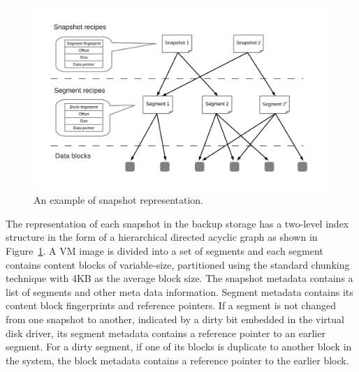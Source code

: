 \begin{figure}[htbp]
  \centering
  \includegraphics[width=5in]{images/snapshot_representation.pdf}
  \caption{An example of snapshot representation.}
  \label{fig:snapshot}
\end{figure}

The representation of each snapshot in the backup
storage has a two-level index structure in the form of a
hierarchical directed acyclic graph as shown in Figure~\ref{fig:snapshot}.
A VM image is divided into a set of segments and each
segment contains content blocks of variable-size, partitioned using the standard chunking technique with 4KB
as the average block size. The snapshot metadata contains a list of segments and other meta data information.
Segment metadata contains its content block fingerprints
and reference pointers. If a segment is not changed from
one snapshot to another, indicated by a dirty bit embedded in the virtual disk driver, its segment metadata contains a reference pointer to an earlier segment. For a
dirty segment, if one of its blocks is duplicate to another
block in the system, the block metadata contains a reference pointer to the earlier block.

